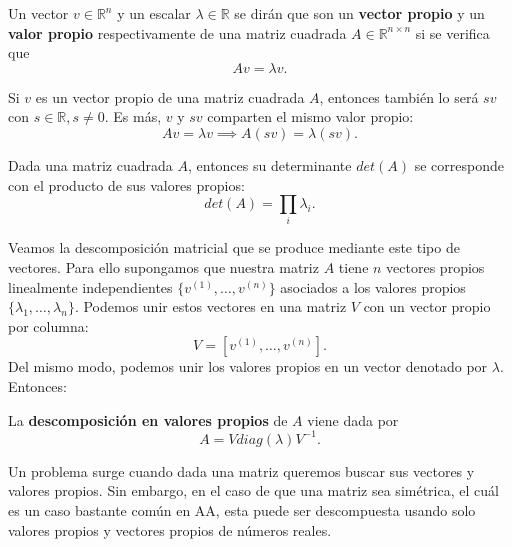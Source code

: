 \begin{definition}
    Un vector $v \in \mathbb{R}^n$ y un escalar $\lambda \in \mathbb{R}$ se dirán que son un \textbf{vector propio} y un \textbf{valor propio} respectivamente de una matriz cuadrada $A \in \mathbb{R}^{n \times n}$ si se verifica que
    \begin{equation}
        Av=\lambda v.
    \end{equation}
\end{definition}

\begin{proposition}
Si $v$ es un vector propio de una matriz cuadrada $A$, entonces también lo será $sv$ con $s \in \mathbb{R}, s \ne 0$. Es más, $v$ y $sv$ comparten el mismo valor propio:
\begin{equation}
    Av = \lambda v \implies A(sv) = \lambda (sv).
\end{equation}
\end{proposition}

\begin{proposition}
    Dada una matriz cuadrada $A$, entonces su determinante $det(A)$ se corresponde con el producto de sus valores propios:
    \begin{equation}
        det(A) = \prod_{i} \lambda_i.
    \end{equation}
\end{proposition}

Veamos la descomposición matricial que se produce mediante este tipo de vectores. Para ello supongamos que nuestra matriz $A$ tiene $n$ vectores propios linealmente independientes $\{v^{(1)}, \ldots, v^{(n)} \}$ asociados a los valores propios $\{ \lambda_1, \ldots, \lambda_n \}$. Podemos unir estos vectores en una matriz $V$ con un vector propio por columna: 
\begin{equation}
    V = [v^{(1)}, \ldots, v^{(n)}].
\end{equation}
Del mismo modo, podemos unir los valores propios en un vector denotado por $\lambda$. Entonces:
\begin{proposition}
    La \textbf{descomposición en valores propios} de $A$ viene dada por
    \begin{equation}
        A = V diag(\lambda)V^{-1}.
    \end{equation}
\end{proposition}

Un problema surge cuando dada una matriz queremos buscar sus vectores y valores propios. Sin embargo, en el caso de que una matriz sea simétrica, el cuál es un caso bastante común en \ac{AA}, esta puede ser descompuesta usando solo valores propios y vectores propios de números reales.

